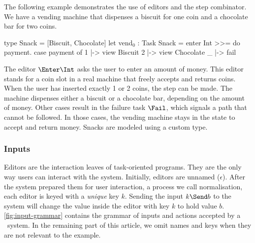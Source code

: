 \begin{example}
  \label{exm:vending-base}
  The following example demonstrates the use of editors and the step combinator.
  We have a vending machine that dispenses a biscuit for one coin and a chocolate bar for two coins.
  \begin{TASK}[emph={payment}]
    type Snack = [Biscuit, Chocolate]
    let vend$_0$ : Task Snack = enter Int >>= do payment.
      case payment of
        1 |-> view Biscuit
        2 |-> view Chocolate
        _ |-> fail
  \end{TASK}
  The editor $\Enter \Int$ asks the user to enter an amount of money.
  This editor stands for a coin slot in a real machine that freely accepts and returns coins.
  When the user has inserted exactly 1 or 2 coins, the step can be made.
  The machine dispenses either a biscuit or a chocolate bar, depending on the amount of money.
  Other cases result in the failure task $\Fail$, which signals a path that cannot be followed.
  In those cases, the vending machine stays in the state to accept and return money.
  Snacks are modeled using a custom type.
\end{example}


\subsubsection{Inputs}
\label{sub:inputs}

Editors are the interaction leaves of task-oriented programs.
They are the only way users can interact with the system.
Initially, editors are unnamed ($\epsilon$).
After the system prepared them for user interaction, a process we call normalisation,
each editor is keyed with a \emph{unique} key $k$.
Sending the input $k \Send b$ to the system will change the value inside the editor with key $k$ to hold value $b$.
\cref{fig:input-grammar} contains the grammar of inputs and actions accepted by a \TOPHAT\ system.
In the remaining part of this article,
we omit names and keys when they are not relevant to the example.

